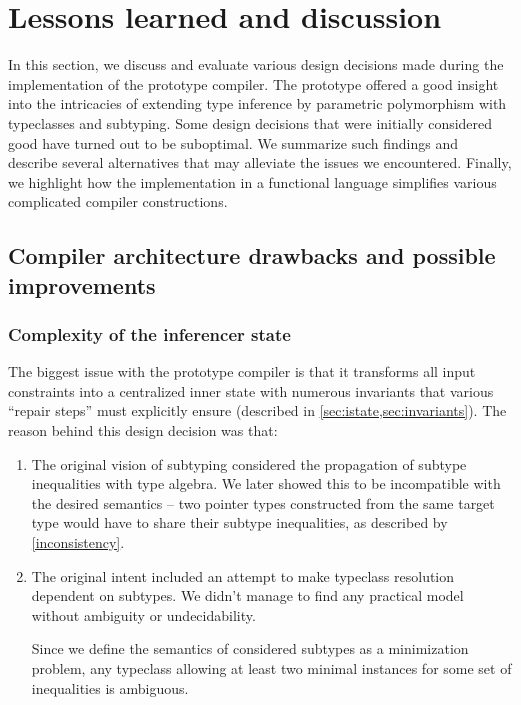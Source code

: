 \chapter{Lessons learned and discussion}
\label{chap5}

In this section, we discuss and evaluate various design decisions made during the implementation of the prototype compiler. The prototype offered a good insight into the intricacies of extending type inference by parametric polymorphism with typeclasses and subtyping. Some design decisions that were initially considered good have turned out to be suboptimal. We summarize such findings and describe several alternatives that may alleviate the issues we encountered. Finally, we highlight how the implementation in a functional language simplifies various complicated compiler constructions.

\section{Compiler architecture drawbacks and possible improvements}
\label{sec:newApproach}

\subsection{Complexity of the inferencer state}
\label{sec:state}

The biggest issue with the prototype compiler is that it transforms all input constraints into a centralized inner state with numerous invariants that various ``repair steps'' must explicitly ensure (described in \cref{sec:istate,sec:invariants}). The reason behind this design decision was that:

\begin{enumerate}
    \item The original vision of subtyping considered the propagation of subtype inequalities with type algebra. We later showed this to be incompatible with the desired semantics -- two pointer types constructed from the same target type would have to share their subtype inequalities, as described by \cref{inconsistency}.

    \item The original intent included an attempt to make typeclass resolution dependent on subtypes. We didn't manage to find any practical model without ambiguity or undecidability.

    Since we define the semantics of considered subtypes as a minimization problem, any typeclass allowing at least two minimal instances for some set of inequalities is ambiguous.
\end{enumerate}


